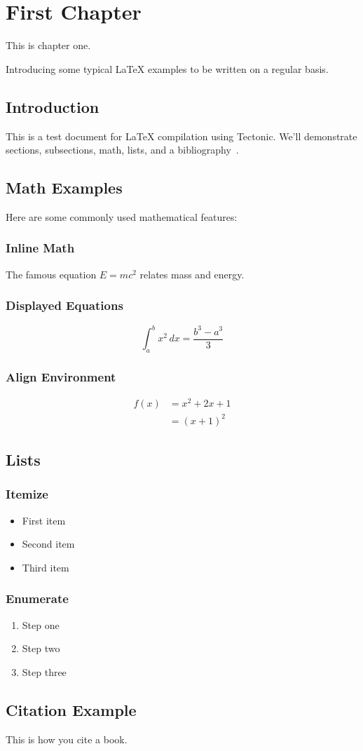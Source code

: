 \chapter{First Chapter}
This is chapter one.

Introducing some typical LaTeX examples to be written on a regular basis.

\section{Introduction}
This is a test document for \LaTeX{} compilation using Tectonic. We'll demonstrate sections, subsections, math, lists, and a bibliography~\cite{knuth1984texbook}.

\section{Math Examples}
Here are some commonly used mathematical features:

\subsection{Inline Math}
The famous equation $E=mc^2$ relates mass and energy.

\subsection{Displayed Equations}
\begin{equation}
    \int_{a}^{b} x^2 \, dx = \frac{b^3 - a^3}{3}
\end{equation}

\subsection{Align Environment}
\begin{align}
    f(x) &= x^2 + 2x + 1 \\
         &= (x+1)^2
\end{align}

\section{Lists}

\subsection{Itemize}
\begin{itemize}
    \item First item
    \item Second item
    \item Third item
\end{itemize}

\subsection{Enumerate}
\begin{enumerate}
    \item Step one
    \item Step two
    \item Step three
\end{enumerate}

\section{Citation Example}
This is how you cite a book\cite{knuth1984texbook}.
